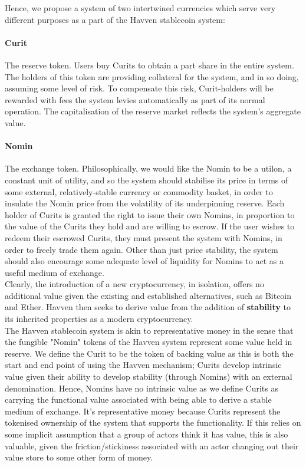 \documentclass{article}
\begin{document}
\noindent Hence, we propose a system of two intertwined currencies which serve very different purposes as a part of the Havven stablecoin system:

\paragraph{Curit} The reserve token. Users buy Curits to obtain a part share in the entire system. The holders of this token are providing collateral for the system, and in so doing, assuming some level of risk. To compensate this risk, Curit-holders will be rewarded with fees the system levies automatically as part of its normal operation. The capitalisation of the reserve market reflects the system's aggregate value.

\paragraph{Nomin} The exchange token. Philosophically, we would like the Nomin to be a utilon, a constant unit of utility, and so the system should stabilise its price in terms of some external, relatively-stable currency or commodity basket, in order to insulate the Nomin price from the volatility of its 
underpinning reserve. Each holder of Curits is granted the right to issue their own Nomins, in proportion to the value of the Curits they hold and are willing to escrow. If the user wishes to redeem their escrowed Curits, they must present the system with Nomins, in order to freely trade them again. Other than just price stability, the system should also encourage some adequate level of liquidity for Nomins to act as a useful medium of exchange. \\

\noindent Clearly, the introduction of a new cryptocurrency, in isolation, offers no additional value given the existing and established alternatives, such as Bitcoin and Ether. Havven then seeks to derive value from the addition of \textbf{stability} to its inherited properties as a modern cryptocurrency. \\

\noindent The Havven stablecoin system is akin to representative money in the sense that the fungible "Nomin" tokens of the Havven system represent some value held in reserve. We define the Curit to be the token of backing value as this is both the start and end point of using the Havven mechanism; Curits develop intrinsic value given their ability to develop stability (through Nomins) with an external denomination. Hence, Nomins have no intrinsic value as we define Curits as carrying the functional value associated with being able to derive a stable medium of exchange. It's representative money because Curits represent the tokenised ownership of the system that supports the functionality. If this relies on some implicit assumption that a group of actors think it has value, this is also valuable, given the friction/stickiness associated with an actor changing out their value store to some other form of money. \\
\end{document}
